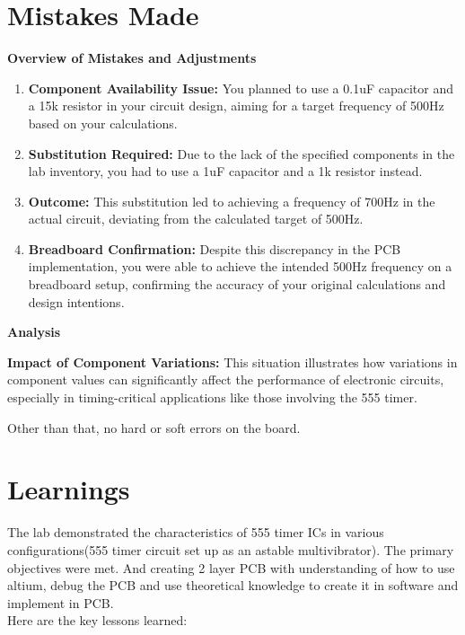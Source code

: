 \documentclass[a4paper,11pt]{article}%
\begin{document}
\section{Mistakes Made}

\textbf{Overview of Mistakes and Adjustments}
\begin{enumerate}
	\item \textbf{Component Availability Issue:} You planned to use a 0.1uF capacitor and a 15k resistor in your circuit design, aiming for a target frequency of 500Hz based on your calculations.
	\item \textbf{Substitution Required:} Due to the lack of the specified components in the lab inventory, you had to use a 1uF capacitor and a 1k resistor instead.
	\item \textbf{Outcome:} This substitution led to achieving a frequency of 700Hz in the actual circuit, deviating from the calculated target of 500Hz.
	\item \textbf{Breadboard Confirmation:} Despite this discrepancy in the PCB implementation, you were able to achieve the intended 500Hz frequency on a breadboard setup, confirming the accuracy of your original calculations and design intentions.
\end{enumerate}

\textbf{Analysis}

\textbf{Impact of Component Variations:} This situation illustrates how variations in component values can significantly affect the performance of electronic circuits, especially in timing-critical applications like those involving the 555 timer.


Other than that, no hard or soft errors on the board.

\section{Learnings}

The lab demonstrated the characteristics of 555 timer ICs in various configurations(555 timer circuit set up as an astable multivibrator). The primary objectives were met. And creating 2 layer PCB with understanding of how to use altium, debug the PCB and use theoretical knowledge to create it in software and implement in PCB.\\

Here are the key lessons learned:\\
\end{document}
